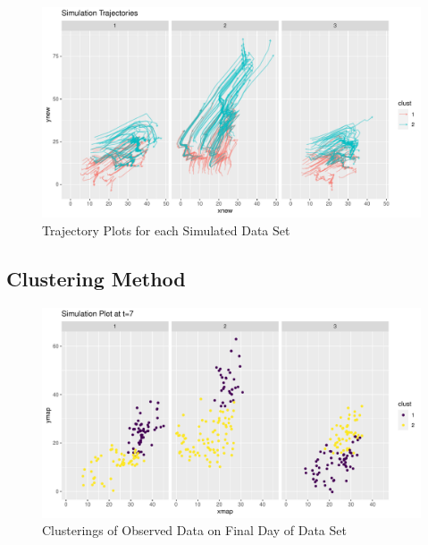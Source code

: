 \documentclass[12pt]{article}
\begin{document}
\begin{figure}[tbp]

{\centering \includegraphics[width=\linewidth,]{spatio-temporal-model-arctic-sea-ice_files/figure-latex/traj-wrap-1} 

}

\caption{Trajectory Plots for each Simulated Data Set }\label{fig:traj-wrap}
\end{figure}

\hypertarget{clustering-method}{%
\subsection{Clustering Method}\label{clustering-method}}

\begin{figure}[tbp]

{\centering \includegraphics[width=\linewidth,]{spatio-temporal-model-arctic-sea-ice_files/figure-latex/all-clus-1} 

}

\caption{Clusterings of Observed Data on Final Day of Data Set}\label{fig:all-clus}
\end{figure}
\end{document}
